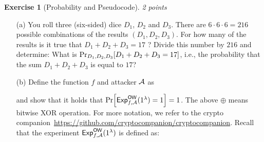 \documentclass[envcountsame,runningheads,notitlepage]{../llncs}
\theoremstyle{definition}
\newtheorem{graded}[crossed]{Exercise}
\begin{document}
\begin{graded}[Probability and Pseudocode] \emph{2 points}
\begin{itemize}
\item[(a)] You roll three (six-sided) dice $D_1$, $D_2$ and $D_3$. There are $6\cdot 6\cdot 6=216$ possible combinations of the results $(D_1,D_2,D_3)$. For how many of the results is it true that $D_1+D_2+D_3=17$ ? Divide this number by $216$ and determine: What is $\probsub{D_1,D_2,D_3}{D_1+D_2+D_3=17}$, i.e., the probability that the sum $D_1+D_2+D_3$ is equal to $17$?

\item[(b)] Define the function $f$ and attacker $\mathcal{A}$ as

\begin{center}
\begin{pchstack}
\pchspace
{}
\end{pchstack}
\end{center}
and show that it holds that $\prob{\mathsf{Exp}_{f,\adv}^{\mathsf{OW}}(1^\lambda) = 1}=1$. The above $\oplus$ means bitwise XOR operation. For more notation, we refer to the crypto companion~\url{https://github.com/cryptocompanion/cryptocompanion}. Recall that the experiment $\mathsf{Exp}_{f,\mathcal{A}}^{\mathsf{OW}}(1^\lambda)$ is defined as:
\begin{center}
\end{center}

\end{itemize}
\end{graded} %
\end{document}
